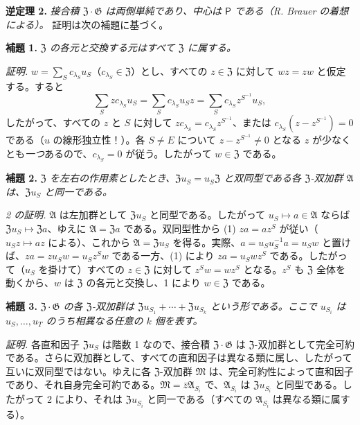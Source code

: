 \noindent\textbf{逆定理 2.} \emph{接合積 \(\mathfrak Z\cdot\mathfrak G\) は両側単純であり、中心は \(\mathsf P\) である（R. Brauer の着想による）。} 証明は次の補題に基づく。

\noindent\textbf{補題 1.} \emph{\(\mathfrak Z\) の各元と交換する元はすべて \(\mathfrak Z\) に属する。}

\noindent\emph{証明.} \(w=\sum_S c_{\lambda_S}u_S\)（\(c_{\lambda_S}\in\mathfrak Z\)）とし、すべての \(z\in\mathfrak Z\) に対して \(wz=zw\) と仮定する。すると
\[
\sum_S zc_{\lambda_S}u_S
=\sum_S c_{\lambda_S}u_Sz
=\sum_S c_{\lambda_S}z^{S^{-1}}u_S,
\]
したがって、すべての \(z\) と \(S\) に対して \(zc_{\lambda_S}=c_{\lambda_S}z^{S^{-1}}\)、または \(c_{\lambda_S}(z-z^{S^{-1}})=0\) である（\(u\) の線形独立性！）。各 \(S\ne E\) について \(z-z^{S^{-1}}\ne0\) となる \(z\) が少なくとも\emph{一つ}あるので、\(c_{\lambda_S}=0\) が従う。したがって \(w\in\mathfrak Z\) である。

\noindent\textbf{補題 2.} \emph{\(\mathfrak Z\) を左右の作用素としたとき、\(\mathfrak Zu_S=u_S\mathfrak Z\) と双同型である各 \(\mathfrak Z\)-双加群 \(\mathfrak A\) は、\(\mathfrak Zu_S\) と同一である。}

\noindent\emph{2 の証明.} \(\mathfrak A\) は左加群として \(\mathfrak Zu_S\) と同型である。したがって \(u_S\mapsto a\in\mathfrak A\) ならば \(\mathfrak Zu_S\mapsto\mathfrak Za\)、ゆえに \(\mathfrak A=\mathfrak Za\) である。双同型性から (1) \(za=az^S\) が従い（\(u_Sz\mapsto az\) による）、これから \(\mathfrak A=\mathfrak Zu_S\) を得る。実際、\(a=u_Su_S^{-1}a=u_Sw\) と置けば、\(za=zu_Sw=u_Sz^Sw\) である一方、(1) により \(za=u_Swz^S\) である。したがって（\(u_S\) を掛けて）すべての \(z\in\mathfrak Z\) に対して \(z^Sw=wz^S\) となる。\(z^S\) も \(\mathfrak Z\) 全体を動くから、\(w\) は \(\mathfrak Z\) の各元と交換し、1 により \(w\in\mathfrak Z\) である。

\noindent\textbf{補題 3.} \emph{\(\mathfrak Z\cdot\mathfrak G\) の各 \(\mathfrak Z\)-双加群は \(\mathfrak Zu_{S_1}+\cdots+\mathfrak Zu_{S_k}\) という形である。ここで \(u_{S_i}\) は \(u_S,\ldots,u_T\) のうち相異なる任意の \(k\) 個を表す。}

\noindent\emph{証明.} 各直和因子 \(\mathfrak Zu_S\) は階数 1 なので、接合積 \(\mathfrak Z\cdot\mathfrak G\) は \(\mathfrak Z\)-双加群として完全可約である。さらに双加群として、すべての直和因子は異なる類に属し、したがって互いに双同型ではない。ゆえに各 \(\mathfrak Z\)-双加群 \(\mathfrak M\) は、完全可約性によって直和因子であり、それ自身完全可約である。\(\mathfrak M=\bar z\mathfrak A_{S_i}\) で、\(\mathfrak A_{S_i}\) は \(\mathfrak Zu_{S_i}\) と同型である。したがって 2 により、それは \(\mathfrak Zu_{S_i}\) と同一である（すべての \(\mathfrak A_{S_i}\) は異なる類に属する）。

